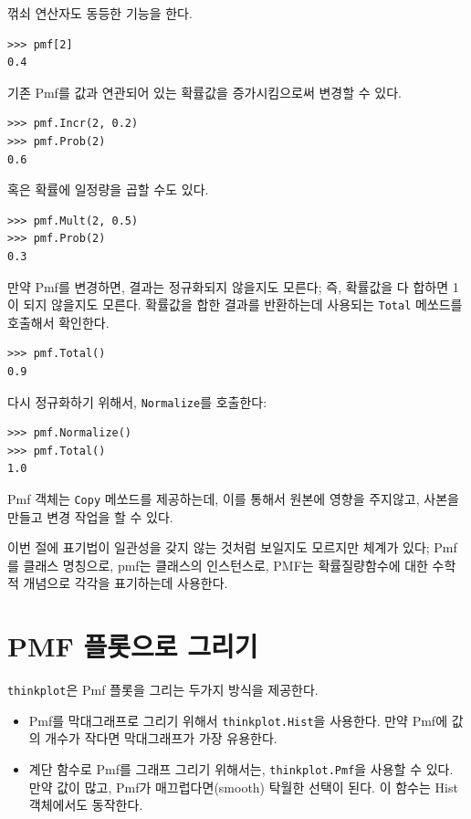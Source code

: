 꺾쇠 연산자도 동등한 기능을 한다.

\begin{verbatim}
>>> pmf[2]
0.4
\end{verbatim}

기존 Pmf를 값과 연관되어 있는 확률값을 증가시킴으로써 변경할 수 있다.
%
\begin{verbatim}
>>> pmf.Incr(2, 0.2)
>>> pmf.Prob(2)
0.6
\end{verbatim}

혹은 확률에 일정량을 곱할 수도 있다.
%
\begin{verbatim}
>>> pmf.Mult(2, 0.5)
>>> pmf.Prob(2)
0.3
\end{verbatim}

만약 Pmf를 변경하면, 결과는 정규화되지 않을지도 모른다; 즉, 확률값을 다 합하면 1이 되지 않을지도 모른다.
확률값을 합한 결과를 반환하는데 사용되는 {\tt Total} 메쏘드를 호출해서 확인한다. 

%
\begin{verbatim}
>>> pmf.Total()
0.9
\end{verbatim}

다시 정규화하기 위해서, {\tt Normalize}를 호출한다:
%
\begin{verbatim}
>>> pmf.Normalize()
>>> pmf.Total()
1.0
\end{verbatim}

Pmf 객체는 {\tt Copy} 메쏘드를 제공하는데, 이를 통해서 원본에 영향을 주지않고, 사본을 만들고 변경 작업을 할 수 있다.

이번 절에 표기법이 일관성을 갖지 않는 것처럼 보일지도 모르지만 체계가 있다;
Pmf를 클래스 명칭으로, pmf는 클래스의 인스턴스로, PMF는 확률질량함수에 대한 수학적 개념으로 각각을 표기하는데 사용한다.

\section{PMF 플롯으로 그리기}

{\tt thinkplot}은 Pmf 플롯을 그리는 두가지 방식을 제공한다.

\begin{itemize}

\item Pmf를 막대그래프로 그리기 위해서 {\tt thinkplot.Hist}을 사용한다.
만약 Pmf에 값의 개수가 작다면 막대그래프가 가장 유용한다.

\item 계단 함수로 Pmf를 그래프 그리기 위해서는, {\tt thinkplot.Pmf}을 사용할 수 있다.
만약 값이 많고, Pmf가 매끄럽다면(smooth) 탁월한 선택이 된다. 이 함수는 Hist 객체에서도 동작한다.

\end{itemize}

